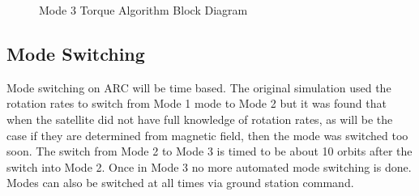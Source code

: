 \begin{figure}[H]
    \centering
    \caption{Mode 3 Torque Algorithm Block Diagram}
    \label{fig:mode3}
\end{figure}

\subsection{Mode Switching}

Mode switching on \ac{ARC} will be time based. The original simulation used the rotation rates to switch from Mode 1 mode to Mode 2 but it was found that when the satellite did not have full knowledge of rotation rates, as will be the case if they are determined from magnetic field, then the mode was switched too soon. The switch from Mode 2 to Mode 3 is timed to be about 10 orbits after the switch into Mode 2. Once in Mode 3 no more automated mode switching is done. Modes can also be switched at all times via ground station command.

